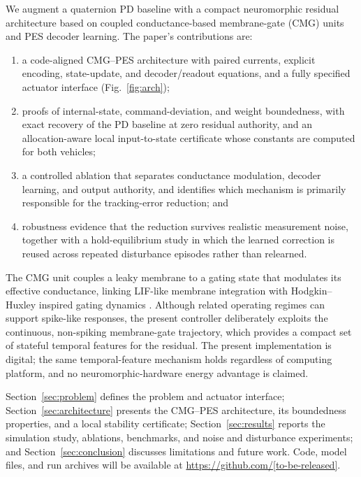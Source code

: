 \documentclass[letterpaper, 10 pt, conference]{ieeeconf}
\newcommand{\coderepo}{\url{https://github.com/[to-be-released]}}
\begin{document}
We augment a quaternion PD baseline with a compact neuromorphic residual architecture based on coupled conductance-based membrane-gate (CMG) units and PES decoder learning. The paper's contributions are:
\begin{enumerate}
    \item a code-aligned CMG--PES architecture with paired currents, explicit encoding, state-update, and decoder/readout equations, and a fully specified actuator interface (Fig.~\ref{fig:arch});
    \item proofs of internal-state, command-deviation, and weight boundedness, with exact recovery of the PD baseline at zero residual authority, and an allocation-aware local input-to-state certificate whose constants are computed for both vehicles;
    \item a controlled ablation that separates conductance modulation, decoder learning, and output authority, and identifies which mechanism is primarily responsible for the tracking-error reduction; and
    \item robustness evidence that the reduction survives realistic measurement noise, together with a hold-equilibrium study in which the learned correction is reused across repeated disturbance episodes rather than relearned.
\end{enumerate}


The CMG unit couples a leaky membrane to a gating state that modulates its effective conductance, linking LIF-like membrane integration with Hodgkin--Huxley inspired gating dynamics \cite{hodgkin1952quantitative}. Although related operating regimes can support spike-like responses, the present controller deliberately exploits the continuous, non-spiking membrane-gate trajectory, which provides a compact set of stateful temporal features for the residual.
The present implementation is digital; the same temporal-feature mechanism holds regardless of computing platform, and no neuromorphic-hardware energy advantage is claimed.

Section~\ref{sec:problem} defines the problem and actuator interface; Section~\ref{sec:architecture} presents the CMG--PES architecture, its boundedness properties, and a local stability certificate; Section~\ref{sec:results} reports the simulation study, ablations, benchmarks, and noise and disturbance experiments; and Section~\ref{sec:conclusion} discusses limitations and future work. Code, model files, and run archives will be available at \coderepo.
\end{document}
